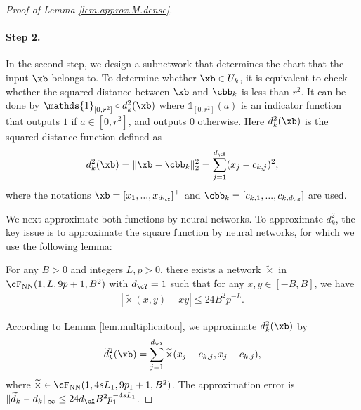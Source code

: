 \documentclass[11pt]{article} %
\begin{document}
\begin{proof}[Proof of Lemma \ref{lem.approx.M.dense}]
	\paragraph{Step 2.} In the second step, we design a subnetwork that determines the chart that the input $\xb$ belongs to. To determine whether $\xb\in U_k$, it is equivalent to check whether the squared distance between $\xb$ and $\cbb_k$ is less than $r^2$. It can be done by $\mathds{1}_{[0,r^2]}\circ d_k^2(\xb)$ where $\mathds{1}_{[0,r^2]}(a)$ is an indicator function that outputs $1$ if $a\in[0,r^2]$, and outputs 0 otherwise. Here $d_k^2(\xb)$ is the squared distance function defined as
	\begin{align*}
		d_k^2(\xb)=\|\xb-\cbb_k\|_2^2=\sum_{j=1}^{d_{\cX}} (x_j-c_{k,j})^2,
	\end{align*}
	where the notations $\xb=[x_1,...,x_{d_{\cX}}]^{\top}$ and $\cbb_k=[c_{k,1},...,c_{k,d_{\cX}}]$ are used. 
	
	
	We next approximate both functions by neural networks. To approximate $d_k^2$, the key issue is to approximate the square function by neural networks, for which we use the following lemma:
	\begin{lemma}\label{lem.multiplicaiton}
		For any $B>0$ and integers $L,p>0$, there exists a network $\widetilde{\times}$ in $\cF_{\rm NN}(1,L,9p+1,B^2)$ with $d_{\cY}=1$ such that for any $x,y\in [-B,B]$, we have
		\begin{align}
			|\widetilde{\times}(x,y)-xy|\leq 24B^2p^{-L}.
		\end{align}
	\end{lemma}
	According to Lemma \ref{lem.multiplicaiton}, we approximate $d_k^2(\xb)$ by
	\begin{align*}
		\widetilde{d}_k^2(\xb)=\sum_{j=1}^{d_{\cX}} \widetilde{\times}(x_j-c_{k,j},x_j-c_{k,j}),
	\end{align*}
	where $\widetilde{\times}\in \cF_{\rm NN}(1,4sL_1,9p_1+1,B^2)$. The approximation error is $\|\widetilde{d}_k-d_k\|_{\infty}\leq 24d_{\cX}B^2p_1^{-4sL_1}$.
	

\end{proof}
\end{document}
